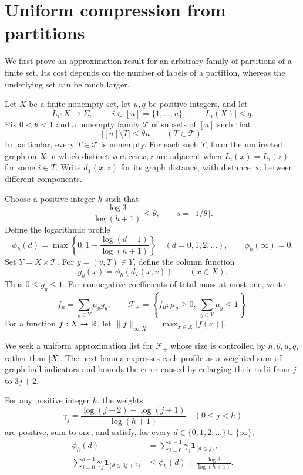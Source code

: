 \section{Uniform compression from partitions}
\label{sec:compression}

We first prove an approximation result for an arbitrary family of partitions
of a finite set.  Its cost depends on the number of labels of a partition,
whereas the underlying set can be much larger.

Let $X$ be a finite nonempty set, let $u,q$ be positive integers, and let
\[
  L_i:X\longrightarrow\Sigma_i,\qquad i\in[u]=\{1,\ldots,u\},
  \qquad |L_i(X)|\le q.
\]
Fix $0<\theta<1$ and a nonempty family $\mathcal T$ of subsets of $[u]$
such that
\begin{equation}
  |[u]\setminus T|\le\theta u\qquad(T\in\mathcal T).
  \label{eq:admissible-sets}
\end{equation}
In particular, every $T\in\mathcal T$ is nonempty.  For each such $T$, form
the undirected graph on $X$ in which distinct vertices $x,z$ are adjacent
when $L_i(x)=L_i(z)$ for some $i\in T$.  Write $d_T(x,z)$ for its graph
distance, with distance $\infty$ between different components.

Choose a positive integer $h$ such that
\begin{equation}
  \frac{\log3}{\log(h+1)}\le\theta,
  \qquad s=\lceil1/\theta\rceil.
  \label{eq:compression-parameters}
\end{equation}
Define the logarithmic profile
\[
  \phi_h(d)=\max\left\{0,1-\frac{\log(d+1)}{\log(h+1)}\right\}
  \quad(d=0,1,2,\ldots),\qquad \phi_h(\infty)=0.
\]
Set $Y=X\times\mathcal T$.  For $y=(v,T)\in Y$, define the column function
\begin{equation}
  g_y(x)=\phi_h(d_T(x,v))\qquad(x\in X).
  \label{eq:column-functions}
\end{equation}
Thus $0\le g_y\le1$.  For nonnegative coefficients of total mass at most
one, write
\[
  f_\mu=\sum_{y\in Y}\mu_y g_y,
  \qquad
  \mathcal F_+=\left\{f_\mu:\mu_y\ge0,\ \sum_{y\in Y}\mu_y\le1\right\}.
\]
For a function $f:X\to\mathbb R$, let
$\|f\|_{\infty,X}=\max_{x\in X}|f(x)|$.

We seek a uniform approximation list for $\mathcal F_+$ whose size is
controlled by $h,\theta,u,q$, rather than $|X|$.  The next lemma expresses
each profile as a weighted sum of graph-ball indicators and bounds the
error caused by enlarging their radii from $j$ to $3j+2$.

\begin{lemma}
\label{lem:log-profile}
For any positive integer $h$, the weights
\[
  \gamma_j=\frac{\log(j+2)-\log(j+1)}{\log(h+1)}
  \quad(0\le j<h)
\]
are positive, sum to one, and satisfy, for every
$d\in\{0,1,2,\ldots\}\cup\{\infty\}$,
\begin{align}
  \phi_h(d)
    &=\sum_{j=0}^{h-1}\gamma_j\mathbf1_{\{d\le j\}},
    \label{eq:profile-expansion}\\
  \sum_{j=0}^{h-1}\gamma_j\mathbf1_{\{d\le3j+2\}}
    &\le\phi_h(d)+\frac{\log3}{\log(h+1)}.
    \label{eq:profile-dilation}
\end{align}
\end{lemma}

